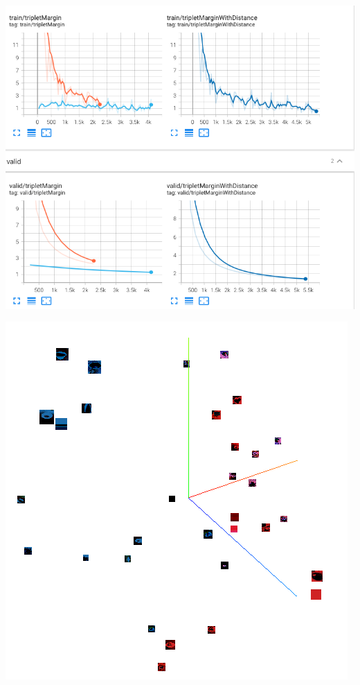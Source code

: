 \documentclass[11pt]{article}
\begin{document}
\begin{center}
    \begin{minipage}{0.48\linewidth}
    \includegraphics[width=\linewidth]{tensorboard_1.png}
    \end{minipage}
\end{center}

\begin{center}
    \begin{minipage}{0.48\linewidth}
    \includegraphics[width=\linewidth]{tensorboard_2.png}
    \end{minipage}
\end{center}
\end{document}
